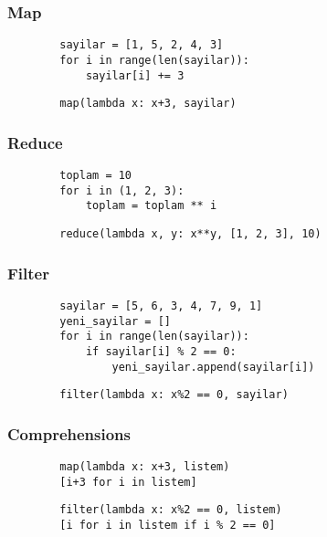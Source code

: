 \documentclass[10pt, compress]{beamer}
\begin{document}
\begin{frame}[fragile]
\frametitle{Map}    
    \begin{verbatim}
        sayilar = [1, 5, 2, 4, 3]
        for i in range(len(sayilar)):
            sayilar[i] += 3
    \end{verbatim}
    
    \begin{verbatim}
        map(lambda x: x+3, sayilar)
    \end{verbatim} 
\end{frame}

\begin{frame}[fragile]
\frametitle{Reduce}    
    \begin{verbatim}
        toplam = 10
        for i in (1, 2, 3):
            toplam = toplam ** i
    \end{verbatim}
    
    \begin{verbatim}
        reduce(lambda x, y: x**y, [1, 2, 3], 10)
    \end{verbatim} 
\end{frame}

\begin{frame}[fragile]
\frametitle{Filter}    
    \begin{verbatim}
        sayilar = [5, 6, 3, 4, 7, 9, 1]
        yeni_sayilar = []
        for i in range(len(sayilar)):
            if sayilar[i] % 2 == 0:
                yeni_sayilar.append(sayilar[i])
    \end{verbatim}
    
    \begin{verbatim}
        filter(lambda x: x%2 == 0, sayilar)
    \end{verbatim} 
\end{frame}

\begin{frame}[fragile]
\frametitle{Comprehensions}    
    \begin{verbatim}
        map(lambda x: x+3, listem)
        [i+3 for i in listem]
    \end{verbatim}
    
    \begin{verbatim}
        filter(lambda x: x%2 == 0, listem)
        [i for i in listem if i % 2 == 0]
    \end{verbatim} 
\end{frame}
\end{document}
